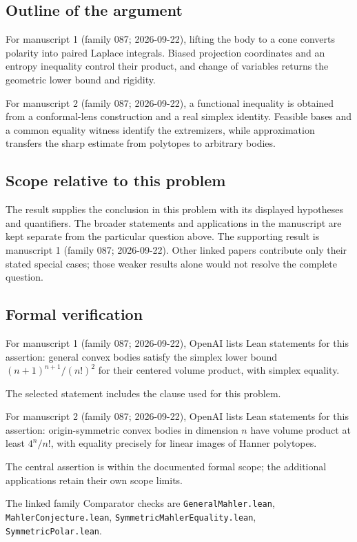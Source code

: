\documentclass[11pt]{article}
\begin{document}
\subsection{Outline of the argument}
For manuscript 1 (family 087; 2026-09-22), lifting the body to a cone converts polarity into paired Laplace integrals. Biased projection coordinates and an entropy inequality control their product, and change of variables returns the geometric lower bound and rigidity.

For manuscript 2 (family 087; 2026-09-22), a functional inequality is obtained from a conformal-lens construction and a real simplex identity. Feasible bases and a common equality witness identify the extremizers, while approximation transfers the sharp estimate from polytopes to arbitrary bodies.

\subsection{Scope relative to this problem}
The result supplies the conclusion in this problem with its displayed hypotheses and quantifiers. The broader statements and applications in the manuscript are kept separate from the particular question above. The supporting result is manuscript 1 (family 087; 2026-09-22). Other linked papers contribute only their stated special cases; those weaker results alone would not resolve the complete question.

\subsection{Formal verification}
For manuscript 1 (family 087; 2026-09-22), OpenAI lists Lean statements for this assertion: general convex bodies satisfy the simplex lower bound $(n+1)^{n+1}/(n!)^2$ for their centered volume product, with simplex equality.

The selected statement includes the clause used for this problem.

For manuscript 2 (family 087; 2026-09-22), OpenAI lists Lean statements for this assertion: origin-symmetric convex bodies in dimension $n$ have volume product at least $4^n/n!$, with equality precisely for linear images of Hanner polytopes.

The central assertion is within the documented formal scope; the additional applications retain their own scope limits.

The linked family Comparator checks are \texttt{GeneralMahler.lean}, \texttt{MahlerConjecture.lean}, \texttt{SymmetricMahlerEquality.lean}, \texttt{SymmetricPolar.lean}.
\end{document}

